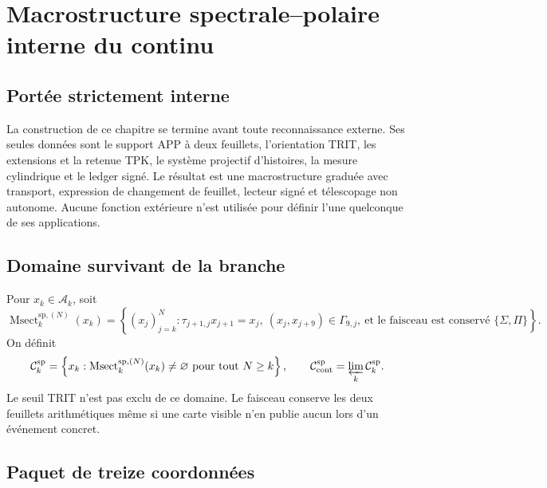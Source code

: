 \iffalse
\chapter{Macrostructure spectrale--polaire interne du continu}
\label{chap:continuo-macro-sp-interna}

\section{Portée strictement interne}

La construction de ce chapitre se termine avant toute reconnaissance
externe. Ses seules données sont le support APP à deux feuillets, l'orientation
TRIT, les extensions et la retenue TPK, le système projectif d'histoires, la
mesure cylindrique et le ledger signé. Le résultat est une macrostructure
graduée avec transport, expression de changement de feuillet, lecteur signé et
télescopage non autonome. Aucune fonction extérieure n'est utilisée pour définir
l'une quelconque de ses applications.

\section{Domaine survivant de la branche}

Pour \(x_k\in\mathcal A_k\), soit
\begin{equation}
\label{eq:continuo-sp-msect-n}
 \operatorname{Msect}^{\mathrm{sp},(N)}_k(x_k)
 =\left\{(x_j)_{j=k}^{N}:
 \tau_{j+1,j}x_{j+1}=x_j,
 \ (x_j,x_{j+9})\in\Gamma_{9,j},
 \ \text{et le faisceau est conservé }\{\Sigma,\Pi\}\right\}.
\end{equation}
On définit
\begin{equation}
\label{eq:continuo-sp-dominio-superviviente}
 \mathcal C_k^{\mathrm{sp}}
 =\left\{x_k:
 \operatorname{Msect}^{\mathrm{sp},(N)}_k(x_k)\neq\varnothing
 \text{ pour tout }N\geq k\right\},
 \qquad
 \mathcal C_{\rm cont}^{\mathrm{sp}}
 =\varprojlim_k\mathcal C_k^{\mathrm{sp}}.
\end{equation}
Le seuil TRIT n'est pas exclu de ce domaine. Le faisceau conserve les deux feuillets
arithmétiques même si une carte visible n'en publie aucun lors d'un
événement concret.

\section{Paquet de treize coordonnées}

